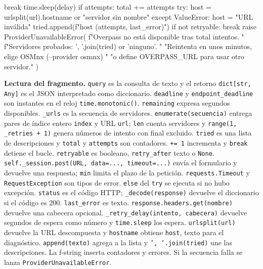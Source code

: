 \documentclass[11pt,a4paper]{article}
\begin{document}
\begin{Codigo}[firstnumber=312]
                        break
                    time.sleep(delay)
            if attempts:
                total += attempts
                try:
                    host = urlsplit(url).hostname or "servidor sin nombre"
                except ValueError:
                    host = "URL inválida"
                tried.append(f"{host} ({attempts}, {last_error})")
            if not retryable:
                break
        raise ProviderUnavailableError(
            f"Overpass no está disponible tras {total} intentos. "
            f"Servidores probados: {', '.join(tried) or 'ninguno'}. "
            "Reintenta en unos minutos, elige OSMnx (--provider osmnx) "
            "o define OVERPASS_URL para usar otro servidor."
        )
\end{Codigo}

\textbf{Lectura del fragmento.} \texttt{query} es la consulta de texto y el retorno \texttt{dict[str, Any]} es el JSON interpretado como diccionario. \texttt{deadline} y \texttt{endpoint\_deadline} son instantes en el reloj \texttt{time.monotonic()}. \texttt{remaining} expresa segundos disponibles. \texttt{\_urls} es la secuencia de servidores. \texttt{enumerate(secuencia)} entrega pares de índice entero \texttt{index} y URL \texttt{url}; \texttt{len} cuenta servidores y \texttt{range(1, \_retries + 1)} genera números de intento con final excluido. \texttt{tried} es una lista de descripciones y \texttt{total} y \texttt{attempts} son contadores. \texttt{+= 1} incrementa y \texttt{break} detiene el bucle. \texttt{retryable} es booleano, \texttt{retry\_after} texto o \texttt{None}. \texttt{self.\_session.post(URL, data=..., timeout=...)} envía el formulario y devuelve una respuesta; \texttt{min} limita el plazo de la petición. \texttt{requests.Timeout} y \texttt{RequestException} son tipos de error. \texttt{else} del \texttt{try} se ejecuta si no hubo excepción. \texttt{status} es el código HTTP; \texttt{\_decode(response)} devuelve el diccionario si el código es 200. \texttt{last\_error} es texto. \texttt{response.headers.get(nombre)} devuelve una cabecera opcional. \texttt{\_retry\_delay(intento, cabecera)} devuelve segundos de espera como número y \texttt{time.sleep} los espera. \texttt{urlsplit(url)} devuelve la URL descompuesta y \texttt{hostname} obtiene \texttt{host}, texto para el diagnóstico. \texttt{append(texto)} agrega a la lista y \texttt{', '.join(tried)} une las descripciones. La f-string inserta contadores y errores. Si la secuencia falla se lanza \texttt{ProviderUnavailableError}.
\end{document}
